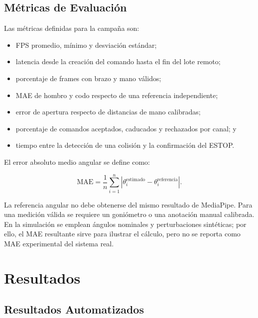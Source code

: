 \subsection{Métricas de Evaluación}
\label{subsec:metricas_evaluacion}

Las métricas definidas para la campaña son:

\begin{itemize}
    \item FPS promedio, mínimo y desviación estándar;
    \item latencia desde la creación del comando hasta el fin del lote remoto;
    \item porcentaje de frames con brazo y mano válidos;
    \item MAE de hombro y codo respecto de una referencia independiente;
    \item error de apertura respecto de distancias de mano calibradas;
    \item porcentaje de comandos aceptados, caducados y rechazados por canal; y
    \item tiempo entre la detección de una colisión y la confirmación del ESTOP.
\end{itemize}

El error absoluto medio angular se define como:

\begin{equation}
    \mathrm{MAE} = \frac{1}{n}\sum_{i=1}^{n}
    \left|\theta_i^{\mathrm{estimado}}-\theta_i^{\mathrm{referencia}}\right|.
    \label{eq:mae_angular}
\end{equation}

La referencia angular no debe obtenerse del mismo resultado de MediaPipe. Para
una medición válida se requiere un goniómetro o una anotación manual calibrada.
En la simulación se emplean ángulos nominales y perturbaciones sintéticas; por
ello, el MAE resultante sirve para ilustrar el cálculo, pero no se reporta como
MAE experimental del sistema real.

\section{Resultados}
\label{sec:resultados}

\subsection{Resultados Automatizados}
\label{subsec:resultados_funcionales}

